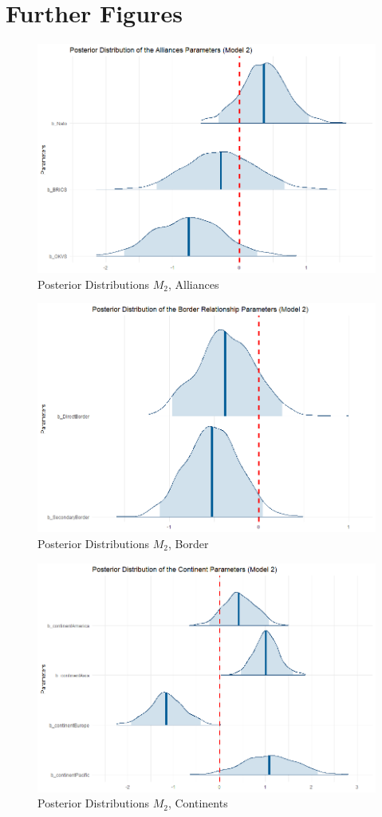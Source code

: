 \documentclass[12pt,a4paper]{article}
\begin{document}
\section{Further Figures}
\label{Appendix Figures}
\begin{figure}[h]
\center
\label{F:B1}
\includegraphics[scale=0.3]{PosteriorPlot_Alliances_Model2.png}
\caption{Posterior Distributions $M_2$, Alliances}
\end{figure}
\vfill
\begin{figure}[h]
\center
\label{F:B2}
\includegraphics[scale=0.3]{PosteriorPlot_Border_Model2.png}
\caption{Posterior Distributions $M_2$, Border}
\end{figure}
\vfill
\begin{figure}[h]
\center
\label{F:B3}
\includegraphics[scale=0.3]{PosteriorPlot_Continents_Model2.png}
\caption{Posterior Distributions $M_2$, Continents}
\end{figure}

\vfill
\end{document}

